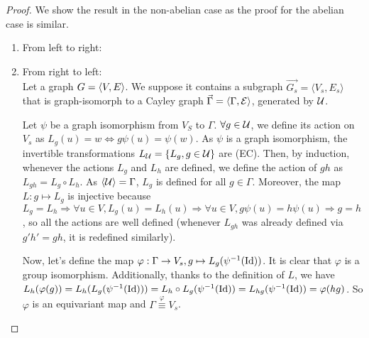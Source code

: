 \begin{proof}
We show the result in the non-abelian case as the proof for the abelian case is similar.
\begin{enumerate}
	\item From left to right:\\

	\item From right to left:\\
Let a graph $G = \langle V, E \rangle$. We suppose it contains a subgraph $\vec{G_s} = \langle V_s, E_s \rangle$ that is graph-isomorph to a Cayley graph $\vec{\Gamma} = \langle \Gamma, \mathcal{E} \rangle$, generated by $\mathcal{U}$.

Let $\psi$ be a graph isomorphism from $V_S$ to $\Gamma$.
$\forall g \in \mathcal{U}$, we define its action on $V_s$ as $L_g(u) = w \Leftrightarrow g\psi(u) = \psi(w)$. As $\psi$ is a graph isomorphism, the invertible transformations $L_{\mathcal{U}} = \{L_g, g \in \mathcal{U} \}$ are (EC). Then, by induction, whenever the actions $L_g$ and $L_h$ are defined, we define the action of $gh$ as $L_{gh}= L_g \circ L_h$. As $\langle \mathcal{U} \rangle = \Gamma$, $L_g$ is defined for all $g \in \Gamma$. Moreover, the map $L: g \mapsto L_g$ is injective because $L_g = L_h \Rightarrow \forall u \in V, L_g(u) = L_h(u) \Rightarrow \forall u \in V, g\psi(u) = h\psi(u) \Rightarrow g = h$, so all the actions are well defined (\ie whenever $L_{gh}$ was already defined via $g'h' = gh$, it is redefined similarly).

Now, let's define the map $\varphi: \Gamma \rightarrow V_s, g \mapsto L_g(\psi^{-1}(\operatorname{Id}))$. It is clear that $\varphi$ is a group isomorphism. Additionally, thanks to the definition of $L$, we have $L_h(\varphi(g)) = L_h(L_g(\psi^{-1}(\operatorname{Id}))) = L_h \circ L_g(\psi^{-1}(\operatorname{Id})) = L_{hg}(\psi^{-1}(\operatorname{Id})) = \varphi(hg)$. So $\varphi$ is an equivariant map and $\Gamma \overset{\varphi}{\equiv} V_s$.


\end{enumerate}

\end{proof}







